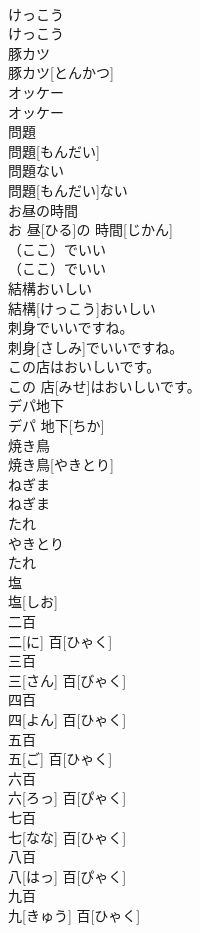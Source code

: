 \documentclass[8pt]{extreport}
\begin{document}
\begin{CJK}{UTF8}{min}
\\	けっこう	
\\	けっこう
\\	豚カツ	
\\	豚カツ[とんかつ]
\\	オッケー	
\\	オッケー
\\	問題	
\\	問題[もんだい]
\\	問題ない	
\\	問題[もんだい]ない
\\	お昼の時間	
\\	お 昼[ひる]の 時間[じかん]
\\	（ここ）でいい	
\\	（ここ）でいい
\\	結構おいしい	
\\	結構[けっこう]おいしい
\\	刺身でいいですね。	
\\	刺身[さしみ]でいいですね。
\\	この店はおいしいです。	
\\	この 店[みせ]はおいしいです。
\\	デパ地下	
\\	デパ 地下[ちか]
\\	焼き鳥	
\\	焼き鳥[やきとり]
\\	ねぎま	
\\	ねぎま
\\	たれ	
\\	やきとり 
\\	たれ
\\	塩	
\\	塩[しお]
\\	二百	
\\	二[に] 百[ひゃく]
\\	三百	
\\	三[さん] 百[びゃく]
\\	四百	
\\	四[よん] 百[ひゃく]
\\	五百	
\\	五[ご] 百[ひゃく]
\\	六百	
\\	六[ろっ] 百[ぴゃく]
\\	七百	
\\	七[なな] 百[ひゃく]
\\	八百	
\\	八[はっ] 百[ぴゃく]
\\	九百	
\\	九[きゅう] 百[ひゃく]

\end{CJK}
\end{document}
